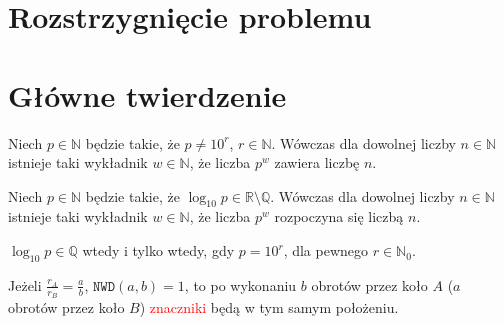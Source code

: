 \documentclass[aspectratio=169]{beamer}
\newcommand{\R}{\mathbb{R}}
\newcommand{\Q}{\mathbb{Q}}
\newcommand{\N}{\mathbb{N}}
\renewcommand{\gcd}[2]{\mathtt{NWD}\paren{#1, #2}}
\newcommand{\paren}[1]{\!\left(#1 \right)}
\begin{document}
{\expSubstrPlotsTex}

\section{Rozstrzygnięcie problemu}
\section{Główne twierdzenie}

\begin{frame}
  \begin{theorem}
    Niech $p \in \N$ będzie takie, że $p \not = 10^r$, $r \in \N$.
    Wówczas dla dowolnej liczby $n \in \N$ istnieje taki wykładnik $w \in \N$, że liczba $p^w$ zawiera liczbę $n$.
  \end{theorem}
  \begin{lemma}
    \label{lemma::powers_begin_with_every_string}
    Niech $p \in \N$ będzie takie, że $\log_{10}p \in \R \setminus \Q$.
    Wówczas dla dowolnej liczby $n \in \N$ istnieje taki wykładnik $w \in \N$, że liczba $p^w$ rozpoczyna się liczbą $n$. 
  \end{lemma}
  \begin{lemma}
    \label{lemma::log_10_irrational_iff}
    $\log_{10}p \in \Q$ wtedy i tylko wtedy, gdy $p = 10^r$, dla pewnego $r \in \N_0$.
  \end{lemma}
\end{frame}

\begin{frame}
  \begin{figure}
    {\wheelsRationalTex}
  \end{figure}
  \begin{theorem}
  Jeżeli $\frac{r_A}{r_B} = \frac{a}{b}$, $\gcd{a}{b} = 1$, to po wykonaniu $b$ obrotów przez koło $A$ ($a$ obrotów przez koło $B$)
  \textcolor{red}{znaczniki} będą w tym samym położeniu.
  \end{theorem}
\end{frame}

\begin{frame}
  \begin{figure}
    {\wheelsIrrationalTex}
  \end{figure}
\end{frame}
\end{document}
